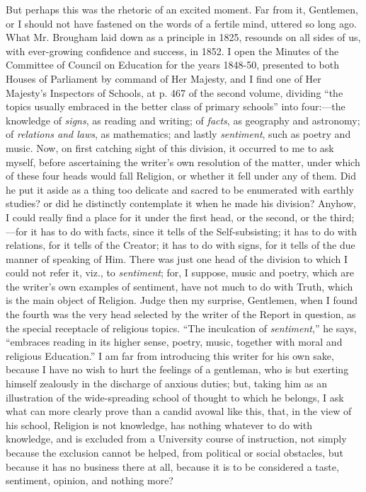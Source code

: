 But perhaps this was the rhetoric of an excited moment. Far from
it, Gentlemen, or I should not have fastened on the words of a fertile
mind, uttered so long ago. What Mr. Brougham laid down as a principle
in 1825, resounds on all sides of us, with ever-growing
confidence and success, in 1852. I open the Minutes of the Committee
of Council on Education for the years 1848-50, presented to both
Houses of Parliament by command of Her Majesty, and I find one of Her
Majesty's Inspectors of Schools, at p. 467 of the second volume,
dividing ``the topics usually embraced in the better class of
primary schools'' into four:—the knowledge of \emph{signs}, as
reading and writing; of \emph{facts}, as geography and astronomy; of \emph{relations
and laws}, as mathematics; and lastly \emph{sentiment}, such as
poetry and music. Now, on first catching sight of this division, it
occurred to me to ask myself, before ascertaining the writer's own
resolution of the matter, under which of these four heads would fall
Religion, or whether it fell under any of them. Did he put it aside as
a thing too delicate and sacred to be enumerated with earthly studies?
or did he distinctly contemplate it when he made his division? Anyhow,
I could really find a place for it under the first head, or the
second, or the third;—for it has to do with facts, since it tells of
the Self-subsisting; it has to do with relations, for it tells of the
Creator; it has to do with signs, for it tells of the due manner of
speaking of Him. There was just one head of the division to which I
could not refer it, viz., to \emph{sentiment}; for, I suppose, music
and poetry, which are the writer's own examples of sentiment, have not
much to do with Truth, which is the main object of Religion. Judge
then my surprise, Gentlemen, when I found the fourth was the very head
selected by the writer of the Report in question, as the special
receptacle of religious topics. ``The inculcation of \emph{sentiment},''
he says, ``embraces reading in its higher sense, poetry, music,
together with moral and religious Education.'' I am far from
introducing this writer for his own sake, because I have no wish
to hurt the feelings of a gentleman, who is but exerting himself
zealously in the discharge of anxious duties; but, taking him as an
illustration of the wide-spreading school of thought to which he
belongs, I ask what can more clearly prove than a candid avowal like
this, that, in the view of his school, Religion is not knowledge, has
nothing whatever to do with knowledge, and is excluded from a
University course of instruction, not simply because the exclusion
cannot be helped, from political or social obstacles, but because it
has no business there at all, because it is to be considered a taste,
sentiment, opinion, and nothing more?

